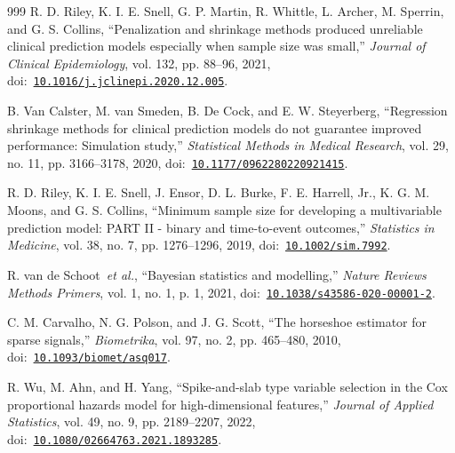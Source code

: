 \begin{thebibliography}{999}
\def\currentbiburl{https://doi.org/10.1016/j.jclinepi.2020.12.005}
 R. D. Riley, K. I. E. Snell, G. P. Martin, R. Whittle, L. Archer, M. Sperrin, and G. S. Collins, ``Penalization and shrinkage methods produced unreliable clinical prediction models especially when sample size was small,'' \emph{Journal of Clinical Epidemiology}, vol. 132, pp. 88--96, 2021, doi:~\href{https://doi.org/10.1016/j.jclinepi.2020.12.005}{\nolinkurl{10.1016/j.jclinepi.2020.12.005}}.

\def\currentbiburl{https://doi.org/10.1177/0962280220921415}
 B. Van Calster, M. van Smeden, B. De Cock, and E. W. Steyerberg, ``Regression shrinkage methods for clinical prediction models do not guarantee improved performance: Simulation study,'' \emph{Statistical Methods in Medical Research}, vol. 29, no. 11, pp. 3166--3178, 2020, doi:~\href{https://doi.org/10.1177/0962280220921415}{\nolinkurl{10.1177/0962280220921415}}.

\def\currentbiburl{https://doi.org/10.1002/sim.7992}
 R. D. Riley, K. I. E. Snell, J. Ensor, D. L. Burke, F. E. Harrell, Jr., K. G. M. Moons, and G. S. Collins, ``Minimum sample size for developing a multivariable prediction model: PART II - binary and time-to-event outcomes,'' \emph{Statistics in Medicine}, vol. 38, no. 7, pp. 1276--1296, 2019, doi:~\href{https://doi.org/10.1002/sim.7992}{\nolinkurl{10.1002/sim.7992}}.

\def\currentbiburl{https://doi.org/10.1038/s43586-020-00001-2}
 R. van de Schoot~\emph{et al.}, ``Bayesian statistics and modelling,'' \emph{Nature Reviews Methods Primers}, vol. 1, no. 1, p. 1, 2021, doi:~\href{https://doi.org/10.1038/s43586-020-00001-2}{\nolinkurl{10.1038/s43586-020-00001-2}}.

\def\currentbiburl{https://doi.org/10.1093/biomet/asq017}
C. M. Carvalho, N. G. Polson, and J. G. Scott, ``The horseshoe estimator for sparse signals,'' \emph{Biometrika}, vol. 97, no. 2, pp. 465--480, 2010, doi:~\href{https://doi.org/10.1093/biomet/asq017}{\nolinkurl{10.1093/biomet/asq017}}.

\def\currentbiburl{https://doi.org/10.1080/02664763.2021.1893285}
 R. Wu, M. Ahn, and H. Yang, ``Spike-and-slab type variable selection in the Cox proportional hazards model for high-dimensional features,'' \emph{Journal of Applied Statistics}, vol. 49, no. 9, pp. 2189--2207, 2022, doi:~\href{https://doi.org/10.1080/02664763.2021.1893285}{\nolinkurl{10.1080/02664763.2021.1893285}}.


\end{thebibliography}
